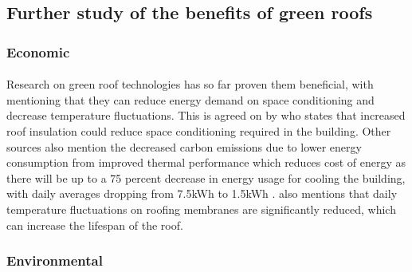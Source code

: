 \documentclass{article}
\begin{document}
\begin{multicols}{2}
  \subsection{Further study of the benefits of green roofs} \label{sec:grben}
  \subsubsection{Economic}
  \paragraph{} Research on green roof technologies has so far proven them
  beneficial, with \cite{energeff} mentioning that they can reduce energy
  demand on space conditioning and decrease temperature fluctuations. This
  is agreed on by \cite{CFGRSG} who states that increased roof insulation
  could reduce space conditioning required in the building. Other
  sources also mention the decreased carbon emissions due to lower energy
  consumption from improved thermal performance \parencite{CommAwareGBSyd}
  which reduces cost of energy as there will be up to a 75 percent
  decrease in energy usage for cooling the building, with daily averages
  dropping from 7.5kWh to 1.5kWh \parencite{energeff}. \cite{energeff} also
  mentions that daily temperature fluctuations on roofing membranes are
  significantly reduced, which can increase the lifespan of the roof.


  \subsubsection{Environmental}

\end{multicols}
\end{document}
